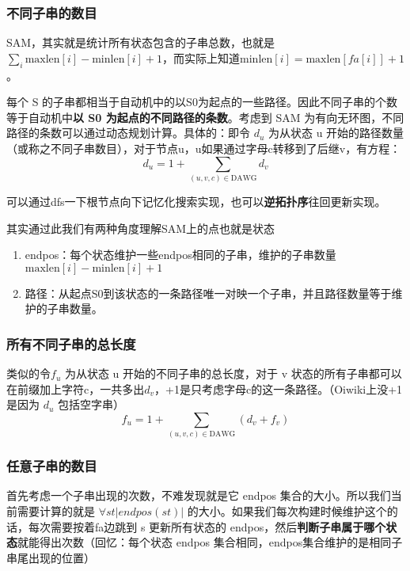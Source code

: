 \subsubsection{不同子串的数目}
\par \noindent SAM，其实就是统计所有状态包含的子串总数，也就是 $\sum_i \text{maxlen}[i]-\text{minlen}[i]+1$，而实际上知道$\text{minlen}[i]=\text{maxlen}[fa[i]]+1$。
~\\
\par \noindent 每个 S 的子串都相当于自动机中的以S0为起点的一些路径。因此不同子串的个数等于自动机中\textbf{以 S0 为起点的不同路径的条数}。考虑到 SAM 为有向无环图，不同路径的条数可以通过动态规划计算。具体的：即令 $d_u$ 为从状态 u 开始的路径数量（或称之不同子串数目），对于节点u，u如果通过字母c转移到了后继v，有方程：
$$
d_u=1+\sum_{(u,v,c)\in\text{DAWG}} d_v
$$
\par \noindent 可以通过dfs一下根节点向下记忆化搜索实现，也可以\textbf{逆拓扑序}往回更新实现。
~\\
\par \noindent 其实通过此我们有两种角度理解SAM上的点也就是状态
\begin{enumerate}
\item endpos：每个状态维护一些endpos相同的子串，维护的子串数量$\text{maxlen}[i]-\text{minlen}[i]+1$
\item 路径：从起点S0到该状态的一条路径唯一对映一个子串，并且路径数量等于维护的子串数量。
\end{enumerate}
\subsubsection{所有不同子串的总长度}

\par \noindent 类似的令$f_u$ 为从状态 u 开始的不同子串的总长度，对于 v 状态的所有子串都可以在前缀加上字符c，一共多出$d_v$，+1是只考虑字母c的这一条路径。（Oiwiki上没+1是因为 $d_u$ 包括空字串）
$$
f_u=1+\sum_{(u,v,c)\in\text{DAWG}} (d_v+f_v)
$$
\subsubsection{任意子串的数目}
\par \noindent 首先考虑一个子串出现的次数，不难发现就是它 endpos 集合的大小。所以我们当前需要计算的就是 $\forall st|endpos(st)|$ 的大小。如果我们每次构建时候维护这个的话，每次需要按着fa边跳到 s 更新所有状态的 endpos，然后\textbf{判断子串属于哪个状态}就能得出次数（回忆：每个状态 endpos 集合相同，endpos集合维护的是相同子串尾出现的位置）

